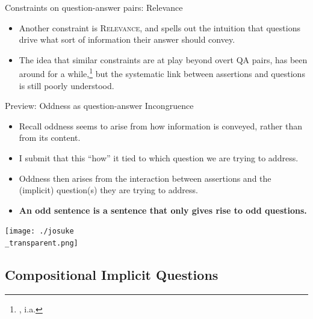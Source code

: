 \documentclass[10pt]{beamer}
\newcommand{\footciteia}[1]{\footnote{\cite{#1}, i.a.}}
\begin{document}
\begin{frame}{Constraints on question-answer pairs: Relevance}
	\begin{itemize}
		\item Another constraint is \textsc{Relevance}, and spells out the intuition that questions drive what sort of information their answer should convey.
		\begin{exe}
		\end{exe}
		\item The idea that similar constraints are at play beyond overt QA pairs, has been around for a while,\footciteia{Lewis1988,Roberts1996,Riester2019} but the systematic link between assertions and questions is still poorly understood.
	\end{itemize}
\end{frame}
\begin{frame}{Preview: Oddness as question-answer Incongruence}
	\begin{itemize}
		\item Recall oddness seems to arise from how information is conveyed, rather than from its content.
		\item I submit that this ``how'' it tied to which question we are trying to address.
		\item Oddness then arises from the interaction between assertions and the (implicit) question(s) they are trying to address.
		\item \textbf{An odd sentence is a sentence that only gives rise to odd questions.}
	\end{itemize}
\end{frame}


\usebackgroundtemplate%
{%
		\texttt{[image: ./josuke\\\_transparent.png]}%
	}
\begin{frame}
	\section[Compositional Implicit Questions]{Compositional Implicit Questions}
\end{frame}
\usebackgroundtemplate{}
\end{document}
